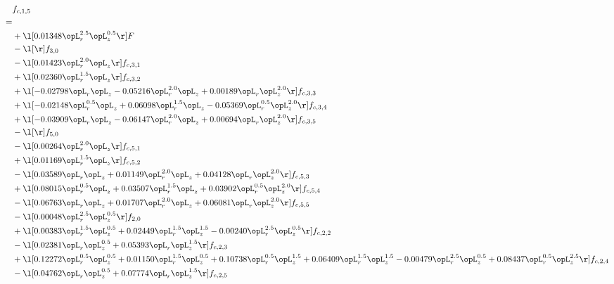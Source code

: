\begin{alignat}{2} 
\label{eq:f_15_2} 
& f_{c,1,5} \nonumber \\ 
 = \\ 
& + \l[  0.01348 \opL_r^{2.5} \opL_z^{0.5}  \r] F \nonumber \\ 
& - \l[  \r] f_{3,0} \nonumber \\ 
& - \l[  0.01423 \opL_r^{2.0} \opL_z  \r] f_{c,3,1} \nonumber \\ 
& + \l[  0.02360 \opL_r^{1.5} \opL_z  \r] f_{c,3,2} \nonumber \\ 
& + \l[  -0.02798 \opL_r \opL_z   -0.05216 \opL_r^{2.0} \opL_z +  0.00189 \opL_r \opL_z^{2.0}  \r] f_{c,3,3} \nonumber \\ 
& + \l[  -0.02148 \opL_r^{0.5} \opL_z +  0.06098 \opL_r^{1.5} \opL_z   -0.05369 \opL_r^{0.5} \opL_z^{2.0}  \r] f_{c,3,4} \nonumber \\ 
& + \l[  -0.03909 \opL_r \opL_z   -0.06147 \opL_r^{2.0} \opL_z +  0.00694 \opL_r \opL_z^{2.0}  \r] f_{c,3,5} \nonumber \\ 
& - \l[  \r] f_{5,0} \nonumber \\ 
& - \l[  0.00264 \opL_r^{2.0} \opL_z  \r] f_{c,5,1} \nonumber \\ 
& + \l[  0.01169 \opL_r^{1.5} \opL_z  \r] f_{c,5,2} \nonumber \\ 
& - \l[  0.03589 \opL_r \opL_z +  0.01149 \opL_r^{2.0} \opL_z +  0.04128 \opL_r \opL_z^{2.0}  \r] f_{c,5,3} \nonumber \\ 
& + \l[  0.08015 \opL_r^{0.5} \opL_z +  0.03507 \opL_r^{1.5} \opL_z +  0.03902 \opL_r^{0.5} \opL_z^{2.0}  \r] f_{c,5,4} \nonumber \\ 
& - \l[  0.06763 \opL_r \opL_z +  0.01707 \opL_r^{2.0} \opL_z +  0.06081 \opL_r \opL_z^{2.0}  \r] f_{c,5,5} \nonumber \\ 
& - \l[  0.00048 \opL_r^{2.5} \opL_z^{0.5}  \r] f_{2,0} \nonumber \\ 
& + \l[  0.00383 \opL_r^{1.5} \opL_z^{0.5} +  0.02449 \opL_r^{1.5} \opL_z^{1.5}   -0.00240 \opL_r^{2.5} \opL_z^{0.5}  \r] f_{c,2,2} \nonumber \\ 
& - \l[  0.02381 \opL_r \opL_z^{0.5} +  0.05393 \opL_r \opL_z^{1.5}  \r] f_{c,2,3} \nonumber \\ 
& + \l[  0.12272 \opL_r^{0.5} \opL_z^{0.5} +  0.01150 \opL_r^{1.5} \opL_z^{0.5} +  0.10738 \opL_r^{0.5} \opL_z^{1.5} +  0.06409 \opL_r^{1.5} \opL_z^{1.5}   -0.00479 \opL_r^{2.5} \opL_z^{0.5} +  0.08437 \opL_r^{0.5} \opL_z^{2.5}  \r] f_{c,2,4} \nonumber \\ 
& - \l[  0.04762 \opL_r \opL_z^{0.5} +  0.07774 \opL_r \opL_z^{1.5}  \r] f_{c,2,5} \nonumber \\ 

\end{alignat}
